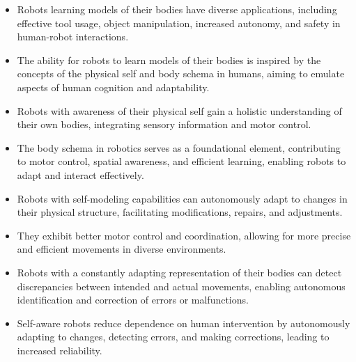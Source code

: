 \documentclass[12pt, a4paper]{article}
\begin{document}
\begin{enumerate}
\begin{itemize}
	\item Robots learning models of their bodies have diverse applications, including effective tool usage, object manipulation, increased autonomy, and safety in human-robot interactions.

	\item The ability for robots to learn models of their bodies is inspired by the concepts of the physical self and body schema in humans, aiming to emulate aspects of human cognition and adaptability.

	\item Robots with awareness of their physical self gain a holistic understanding of their own bodies, integrating sensory information and motor control.

	\item The body schema in robotics serves as a foundational element, contributing to motor control, spatial awareness, and efficient learning, enabling robots to adapt and interact effectively.

	\item Robots with self-modeling capabilities can autonomously adapt to changes in their physical structure, facilitating modifications, repairs, and adjustments.

	\item They exhibit better motor control and coordination, allowing for more precise and efficient movements in diverse environments.

	\item Robots with a constantly adapting representation of their bodies can detect discrepancies between intended and actual movements, enabling autonomous identification and correction of errors or malfunctions.

	\item Self-aware robots reduce dependence on human intervention by autonomously adapting to changes, detecting errors, and making corrections, leading to increased reliability.

\end{itemize}





\end{enumerate}
\end{document}
